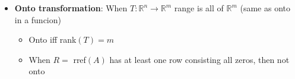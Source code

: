 \documentclass[15pt]{article}
\begin{document}
\begin{flushleft}
\begin{itemize}
                \begin{itemize}
                        \item A transformation $T: \mathbb{R}^n \to 
                                \mathbb{R}^m$ is one-to-one iff ker$(T) = 
                                \vec{0}_n$
                                \begin{itemize}
                                        \item If $R=$ rref$(A)$ has non-pivot 
                                                columns (free variables) then 
                                                $T$ is not one-to-one
                                \end{itemize}
                \end{itemize}
      \item \textbf{Onto transformation}: When $T: \mathbb{R}^n \to 
                \mathbb{R}^m$ range is all of $\mathbb{R}^m$ (same as onto in a
                funcion)
                \begin{itemize}
                        \item Onto iff rank$(T) = m$
                        \item When $R=$ rref$(A)$ has at least one row 
                                consisting all zeros, then not onto
                \end{itemize}
\end{itemize}


\end{flushleft}
\end{document}
